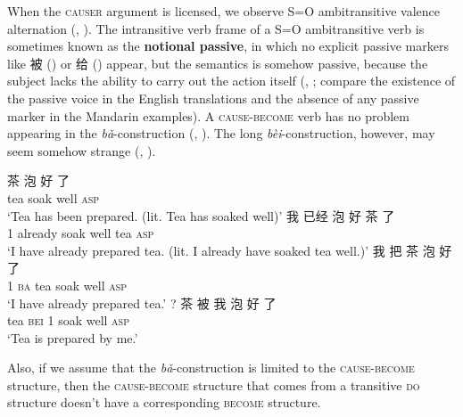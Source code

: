 \documentclass[UTF8, a4paper, oneside, scheme=plain, 12pt]{ctexrep}
\newcommand*{\concept}[1]{\textbf{#1}}
\newcommand{\form}[1]{\emph{#1}}
\newcommand{\translate}[1]{`#1'}
\newcommand*{\category}[1]{\textsc{#1}}
\begin{document}
When the \category{causer} argument is licensed,
we observe S=O ambitransitive valence alternation
(, 
).
The intransitive verb frame of a S=O ambitransitive verb 
is sometimes known as the \concept{notional passive}, 
in which no explicit passive markers like 被 
()
or 给 () appear, 
but the semantics is somehow passive,
because the subject lacks the ability to carry out the action itself
(,
; 
compare the existence of the passive voice in the English translations
and the absence of any passive marker in the Mandarin examples).
A \category{cause}-\category{become} verb
has no problem appearing in the \form{bǎ}-construction
(, ).
The long \form{bèi}-construction, however, 
may seem somehow strange
(, ).

\begin{exe}
    \ex\label{ex:verb-phrase.notional-pass.1} 
    \gll 茶 泡 好 了 \\
    tea soak well \category{asp} \\
    \translate{Tea has been prepared.
    (lit. Tea has soaked well)}
    \ex\label{ex:verb-phrase.notional-pass.trans-1} 
    \gll 我 已经 泡 好 茶 了 \\
    1 already soak well tea \category{asp} \\
    \glt \translate{I have already prepared tea. (lit. I already have soaked tea well.)}
    \ex\label{ex:verb-phrase.notional-pass.ba-1}
    \gll 我 把 茶 泡 好 了 \\
    1 \category{ba} tea soak well \category{asp} \\
    \glt \translate{I have already prepared tea.}
    \ex\label{ex:verb-phrase.notional-pass.bei-1} 
    \gll ? 茶 被 我 泡 好 了 \\
    {} tea \category{bei} 1 soak well \category{asp} \\
    \glt \translate{Tea is prepared by me.}
\end{exe}

Also, if we assume that the \form{bǎ}-construction
is limited to the \category{cause}-\category{become} structure,
then the \category{cause}-\category{become} structure 
that comes from a transitive \category{do} structure 
doesn't have a corresponding \category{become} structure.
\end{document}

